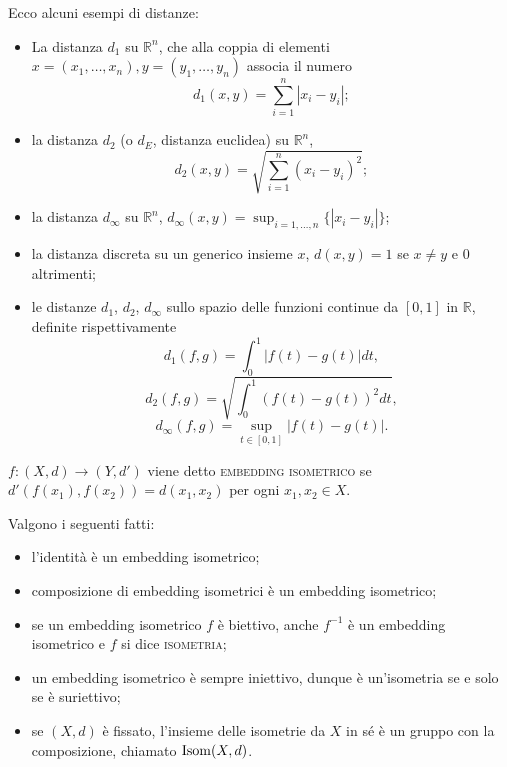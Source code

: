 \documentclass{article}
\begin{document}
\begin{ex}
    Ecco alcuni esempi di distanze:
    \begin{itemize}
        \item La distanza $d_1$ su $\mathbb{R}^n$, che alla coppia di elementi
        ${x=(x_1, \dots, x_n)}, {y=(y_1, \dots, y_n)}$ associa il numero
        $${\displaystyle d_1(x, y)=\sum_{i=1}^n |x_i-y_i|};$$
        \item la distanza $d_2$ (o $d_E$, distanza euclidea) su $\mathbb{R}^n$,
        $$\displaystyle d_2(x, y)=\sqrt{\sum_{i=1}^n (x_i-y_i)^2};$$
        \item la distanza $d_{\infty}$ su $\mathbb{R}^n$, ${\displaystyle
        d_{\infty}(x, y)=\sup_{i=1, \dots, n} \{ |x_i-y_i| \}}$;
        \item
        la distanza discreta su un generico insieme $x$, $d(x, y)=1$ se $x \not=
        y$ e $0$ altrimenti;
        \item le distanze $d_1$, $d_2$, $d_{\infty}$ sullo spazio delle funzioni
        continue da $[0, 1]$ in $\mathbb{R}$, definite rispettivamente
        $${\displaystyle d_1(f, g)=\int_0^1 |f(t)-g(t)| dt},$$
        $${\displaystyle d_2(f, g)=\sqrt{\int_0^1 (f(t)-g(t))^2 dt}},$$
        $${\displaystyle d_{\infty}(f, g)=\sup_{t \in [0, 1]} |f(t)-g(t)|}.$$
    \end{itemize}
\end{ex}

\begin{defn}
	$f:(X, d) \rightarrow (Y, d')$ viene detto \textsc{embedding isometrico} se
	$d'(f(x_1), f(x_2))=d(x_1, x_2)$ per ogni $x_1, x_2 \in X$.
\end{defn}

\begin{oss}
    Valgono i seguenti fatti:
    \begin{itemize}
        \item l'identità è un embedding isometrico;
        \item composizione di embedding isometrici è un embedding isometrico;
        \item se un embedding isometrico $f$ è biettivo, anche $f^{-1}$ è un
        embedding isometrico e $f$ si dice \textsc{isometria};
        \item un embedding isometrico è sempre iniettivo, dunque è un'isometria
        se e solo se è suriettivo;
        \item se $(X, d)$ è fissato, l'insieme delle isometrie da $X$ in sé è un
        gruppo con la composizione, chiamato $\operatorname{Isom} (X,d)$.
    \end{itemize}
\end{oss}
\end{document}
